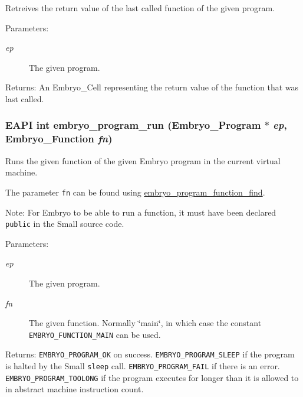 Retreives the return value of the last called function of the given program. 

\begin{Desc}
\item[Parameters:]
\begin{description}
\item[{\em ep}]The given program. \end{description}
\end{Desc}
\begin{Desc}
\item[Returns:]An Embryo\_\-Cell representing the return value of the function that was last called. \end{Desc}
\hypertarget{group__Embryo__Run__Group_ga061469476a430fd33e89951300fd62a}{
\subsubsection{\setlength{\rightskip}{0pt plus 5cm}EAPI int embryo\_\-program\_\-run (Embryo\_\-Program $\ast$ {\em ep}, \/  Embryo\_\-Function {\em fn})}}
\label{group__Embryo__Run__Group_ga061469476a430fd33e89951300fd62a}


Runs the given function of the given Embryo program in the current virtual machine. 

The parameter {\tt fn} can be found using \hyperlink{group__Embryo__Func__Group_g8da497a811da37c0396eeeb6b9331679}{embryo\_\-program\_\-function\_\-find}.

\begin{Desc}
\item[Note:]For Embryo to be able to run a function, it must have been declared {\tt public} in the Small source code.\end{Desc}
\begin{Desc}
\item[Parameters:]
\begin{description}
\item[{\em ep}]The given program. \item[{\em fn}]The given function. Normally \char`\"{}main\char`\"{}, in which case the constant {\tt EMBRYO\_\-FUNCTION\_\-MAIN} can be used. \end{description}
\end{Desc}
\begin{Desc}
\item[Returns:]{\tt EMBRYO\_\-PROGRAM\_\-OK} on success. {\tt EMBRYO\_\-PROGRAM\_\-SLEEP} if the program is halted by the Small {\tt sleep} call. {\tt EMBRYO\_\-PROGRAM\_\-FAIL} if there is an error. {\tt EMBRYO\_\-PROGRAM\_\-TOOLONG} if the program executes for longer than it is allowed to in abstract machine instruction count. \end{Desc}


